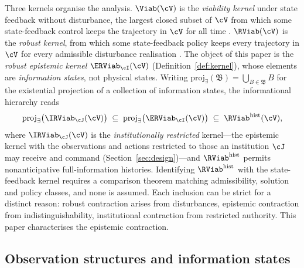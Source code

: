 Three kernels organise the analysis. $\Viab(\cV)$ is the \emph{viability kernel} under state feedback without disturbance, the largest closed subset of $\cV$ from which some state-feedback control keeps the trajectory in $\cV$ for all time \citep{aubin1991}. $\RViab(\cV)$ is the \emph{robust kernel}, from which some state-feedback policy keeps every trajectory in $\cV$ for every admissible disturbance realisation \citep{aubinfrankowska1990}. The object of this paper is the \emph{robust epistemic kernel} $\ERViab_\cI(\cV)$ (Definition~\ref{def:kernel}), whose elements are \emph{information states}, not physical states. Writing $\mathrm{proj}_\exists(\mathfrak B)=\bigcup_{B\in\mathfrak B}B$ for the existential projection of a collection of information states, the informational hierarchy reads
\begin{equation}\label{eq:hierarchy}
\mathrm{proj}_\exists\bigl(\IRViab_\cJ(\cV)\bigr)\;\subseteq\;\mathrm{proj}_\exists\bigl(\ERViab_\cI(\cV)\bigr)\;\subseteq\;\RViab^{\mathrm{hist}}(\cV),
\end{equation}
where $\IRViab_\cJ(\cV)$ is the \emph{institutionally restricted} kernel---the epistemic kernel with the observations and actions restricted to those an institution $\cJ$ may receive and command (Section~\ref{sec:design})---and $\RViab^{\mathrm{hist}}$ permits nonanticipative full-information histories. Identifying $\RViab^{\mathrm{hist}}$ with the state-feedback kernel requires a comparison theorem matching admissibility, solution and policy classes, and none is assumed. Each inclusion can be strict for a distinct reason: robust contraction arises from disturbances, epistemic contraction from indistinguishability, institutional contraction from restricted authority. This paper characterises the epistemic contraction.

\subsection{Observation structures and information states}\label{sec:information}

